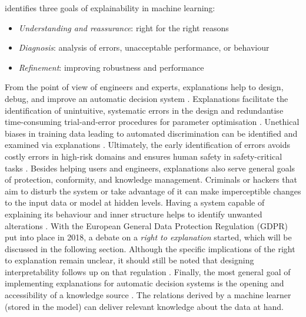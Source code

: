 \cite{liu2017towards} identifies three goals of explainability in machine learning:
\begin{itemize}
	\item \textit{Understanding and reassurance}: right for the right reasons
	\item \textit{Diagnosis}: analysis of errors, unacceptable performance, or behaviour
	\item \textit{Refinement}: improving robustness and performance
\end{itemize}
From the point of view of engineers and experts, explanations help to design, debug, and improve an automatic decision system \cite{preece2018asking}. Explanations facilitate the identification of unintuitive, systematic errors \cite{gilpin2018explaining, ribeiro2016should} in the design and redundantise time-consuming trial-and-error procedures for parameter optimisation \cite{liu2017towards}. Unethical biases in training data leading to automated discrimination \cite{diakopoulos2016accountability} can be identified and examined via explanations \cite{gilpin2018explaining, ribeiro2016should, richardson2018survey}. Ultimately, the early identification of errors avoids costly errors in high-risk domains \cite{bibal2016interpretability, diakopoulos2016accountability, van2018contrastive} and ensures human safety in safety-critical tasks \cite{gilpin2018explaining, richardson2018survey}.\newline
Besides helping users and engineers, explanations also serve general goals of protection, conformity, and knowledge management. Criminals or hackers that aim to disturb the system or take advantage of it can make imperceptible changes to the input data or model at hidden levels. Having a system capable of explaining its behaviour and inner structure helps to identify unwanted alterations \cite{gilpin2018explaining}. With the European General Data Protection Regulation (GDPR) put into place in 2018, a debate on a \textit{right to explanation} started, which will be discussed in the following section. Although the specific implications of the right to explanation remain unclear, it should still be noted that designing interpretability follows up on that regulation \cite{goodman16eu} \cite{gilpin2018explaining} \cite{bibal2016interpretability}. Finally, the most general goal of implementing explanations for automatic decision systems is the opening and accessibility of a knowledge source \cite{bibal2016interpretability} \cite{richardson2018survey}. The relations derived by a machine learner (stored in the model) can deliver relevant knowledge about the data at hand.\newline


